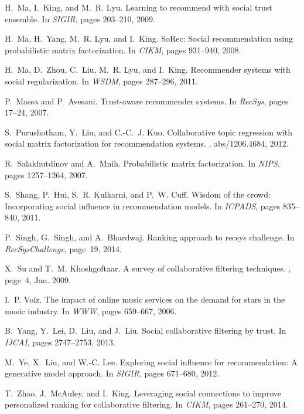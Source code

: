 \documentclass{sig-alternate-2013}
\begin{document}
\begin{thebibliography}{10}
H.~Ma, I.~King, and M.~R. Lyu.
\newblock Learning to recommend with social trust ensemble.
\newblock In {\em SIGIR}, pages 203--210, 2009.

H.~Ma, H.~Yang, M.~R. Lyu, and I.~King.
\newblock So{R}ec: Social recommendation using probabilistic matrix
  factorization.
\newblock In {\em CIKM}, pages 931--940, 2008.

H.~Ma, D.~Zhou, C.~Liu, M.~R. Lyu, and I.~King.
\newblock Recommender systems with social regularization.
\newblock In {\em WSDM}, pages 287--296, 2011.

P.~Massa and P.~Avesani.
\newblock Trust-aware recommender systems.
\newblock In {\em RecSys}, pages 17--24, 2007.

S.~Purushotham, Y.~Liu, and C.-C.~J. Kuo.
\newblock Collaborative topic regression with social matrix factorization for
  recommendation systems.
, abs/1206.4684, 2012.

R.~Salakhutdinov and A.~Mnih.
\newblock Probabilistic matrix factorization.
\newblock In {\em NIPS}, pages 1257--1264, 2007.

S.~Shang, P.~Hui, S.~R. Kulkarni, and P.~W. Cuff.
\newblock Wisdom of the crowd: Incorporating social influence in recommendation
  models.
\newblock In {\em ICPADS}, pages 835--840, 2011.

P.~Singh, G.~Singh, and A.~Bhardwaj.
\newblock Ranking approach to recsys challenge.
\newblock In {\em RecSysChallenge}, page~19, 2014.

X.~Su and T.~M. Khoshgoftaar.
\newblock A survey of collaborative filtering techniques.
, page~4, Jan. 2009.

I.~P. Volz.
\newblock The impact of online music services on the demand for stars in the
  music industry.
\newblock In {\em WWW}, pages 659--667, 2006.

B.~Yang, Y.~Lei, D.~Liu, and J.~Liu.
\newblock Social collaborative filtering by trust.
\newblock In {\em IJCAI}, pages 2747--2753, 2013.

M.~Ye, X.~Liu, and W.-C. Lee.
\newblock Exploring social influence for recommendation: A generative model
  approach.
\newblock In {\em SIGIR}, pages 671--680, 2012.

T.~Zhao, J.~McAuley, and I.~King.
\newblock Leveraging social connections to improve personalized ranking for
  collaborative filtering.
\newblock In {\em CIKM}, pages 261--270, 2014.

\end{thebibliography}
\end{document}
